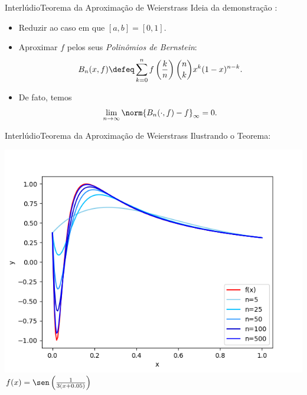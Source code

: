 \documentclass[13pt]{beamer}
\begin{document}
\begin{frame}{Interlúdio}{Teorema da Aproximação de Weierstrass}
    Ideia da demonstração \cite{weierstrass}:
    \begin{itemize}
        \item<1-> Reduzir ao caso em que \( [a, b] = [0, 1] \).
        \item<2-> Aproximar \( f \) pelos seus \emph{Polinômios de Bernstein}:
            \begin{equation*}
                B_{ n } ( x, f ) \defeq \sum_{ k=0 }^{ n } f
                \left( \frac{ k }{ n } \right)
                \binom{n}{k}
                x^{ k }
                ( 1 - x )^{ n - k }
            .\end{equation*}
        \item<3-> De fato, temos
            \begin{equation*}
                \lim_{ n \to \infty } \norm{ B_{ n } ( \cdot, f ) - f }_{ \infty } = 0
            .\end{equation*}
    \end{itemize}
\end{frame}

\begin{frame}{Interlúdio}{Teorema da Aproximação de Weierstrass}
    \vspace{3pt}
    Ilustrando o Teorema:
    \begin{center}
        \includegraphics[width=.75\textwidth]{../figuras/weierstrass_seno.png}
        \( f ( x ) = \sen \left( \frac{ 1 }{ 3 ( x + 0.05 ) } \right) \)
    \end{center}
\end{frame}
\end{document}
